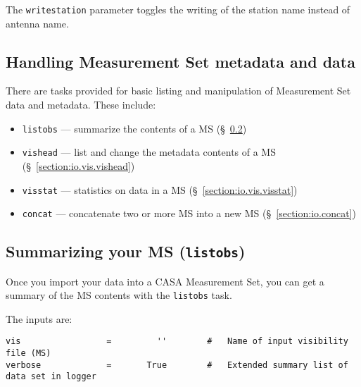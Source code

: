 The {\tt writestation} parameter toggles the writing of the station
name instead of antenna name.

\subsection{Handling Measurement Set metadata and data}
\label{section:io.vis}

There are tasks provided for basic listing and manipulation of
Measurement Set data and metadata.  These include:
\begin{itemize}
   \item {\tt listobs} --- summarize the contents of a MS 
         (\S~\ref{section:io.list})
   \item {\tt vishead} --- list and change the metadata contents of a MS 
         (\S~\ref{section:io.vis.vishead})
   \item {\tt visstat} --- statistics on data in a MS 
         (\S~\ref{section:io.vis.visstat})
   \item {\tt concat} --- concatenate two or more MS into a
         new MS (\S~\ref{section:io.concat})
\end{itemize}

\subsection{Summarizing your MS ({\tt listobs})}
\label{section:io.list}

Once you import your data into a CASA Measurement Set, you can
get a summary of the MS contents with the {\tt listobs} task.

The inputs are:
\small
\begin{verbatim}
vis                 =         ''        #   Name of input visibility file (MS)
verbose             =       True        #   Extended summary list of data set in logger
\end{verbatim}
\normalsize

